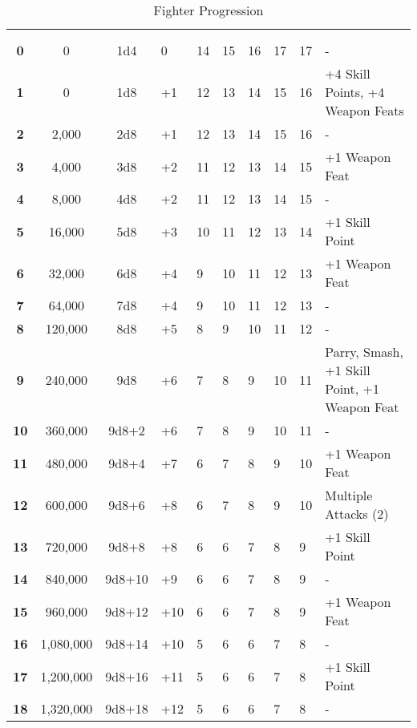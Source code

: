 \begin {table}[H]
  \caption{Fighter Progression}
	\begin{tabularx}{\columnwidth}{>{\bfseries}cccM{.31in}M{.51in}M{.25in}M{.43in}M{.32in}M{.45in}Y}
    \thead{}&\thead{}&\thead{}&\thead{}&\thead{}&\setcounter{rownum}{0}\\
     &  &  &  &  &  &  &  &  & \\
		0 & 0 & 1d4 & 0 & 14 & 15 & 16 & 17 & 17 & -\\
		1 & 0 & 1d8 & +1 & 12 & 13 & 14 & 15 & 16 & +4 Skill Points, +4 Weapon Feats\\
		2 & 2,000 & 2d8 & +1 & 12 & 13 & 14 & 15 & 16 & -\\
		3 & 4,000 & 3d8 & +2 & 11 & 12 & 13 & 14 & 15 & +1 Weapon Feat\\
		4 & 8,000 & 4d8 & +2 & 11 & 12 & 13 & 14 & 15 & -\\
		5 & 16,000 & 5d8 & +3 & 10 & 11 & 12 & 13 & 14 & +1 Skill Point\\
		6 & 32,000 & 6d8 & +4 & 9 & 10 & 11 & 12 & 13 & +1 Weapon Feat\\
		7 & 64,000 & 7d8 & +4 & 9 & 10 & 11 & 12 & 13 & -\\
		8 & 120,000 & 8d8 & +5 & 8 & 9 & 10 & 11 & 12 & -\\
		9 & 240,000 & 9d8 & +6 & 7 & 8 & 9 & 10 & 11 & Parry, Smash, +1 Skill Point, +1 Weapon Feat\\
		10 & 360,000 & 9d8+2 & +6 & 7 & 8 & 9 & 10 & 11 & -\\
		11 & 480,000 & 9d8+4 & +7 & 6 & 7 & 8 & 9 & 10 & +1 Weapon Feat\\
		12 & 600,000 & 9d8+6 & +8 & 6 & 7 & 8 & 9 & 10 & Multiple Attacks (2)\\
		13 & 720,000 & 9d8+8 & +8 & 6 & 6 & 7 & 8 & 9 & +1 Skill Point\\
		14 & 840,000 & 9d8+10 & +9 & 6 & 6 & 7 & 8 & 9 & -\\
		15 & 960,000 & 9d8+12 & +10 & 6 & 6 & 7 & 8 & 9 & +1 Weapon Feat\\
		16 & 1,080,000 & 9d8+14 & +10 & 5 & 6 & 6 & 7 & 8 & -\\
		17 & 1,200,000 & 9d8+16 & +11 & 5 & 6 & 6 & 7 & 8 & +1 Skill Point\\
		18 & 1,320,000 & 9d8+18 & +12 & 5 & 6 & 6 & 7 & 8 & -\\

\end{tabularx}
\end{table}
